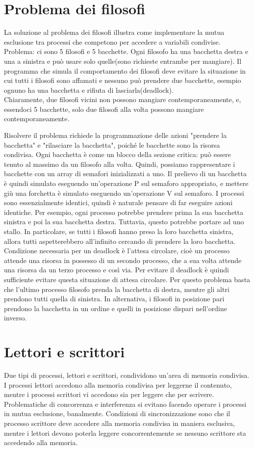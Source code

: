 \documentclass[10pt,a4paper]{book}
\begin{document}
\section{Problema dei filosofi}
La soluzione al problema dei filosofi illustra come implementare la mutua esclusione tra processi che competono per accedere a variabili condivise.
Problema: ci sono 5 filosofi e 5 bacchette. Ogni filosofo ha una bacchetta destra e una a sinistra e può usare solo quelle(sono richieste entrambe per mangiare). Il programma che simula il comportamento dei filosofi deve evitare la situazione in cui tutti i filosofi sono affamati e nessuno può prendere due bacchette, esempio ognuno ha una bacchetta e rifiuta di lasciarla(deadlock).\\
Chiaramente, due filosofi vicini non possono mangiare contemporaneamente, e, essendoci 5 bacchette, solo due filosofi alla volta possono mangiare contemporaneamente.

Risolvere il problema richiede la programmazione delle azioni "prendere la bacchetta" e "rilasciare la bacchetta", poiché le bacchette sono la risorsa condivisa.
Ogni bacchetta è come un blocco della sezione critica: può essere tenuto al massimo da un filosofo alla volta. Quindi, possiamo rappresentare i bacchette con un array di
semafori inizializzati a uno. Il prelievo di un bacchetta è quindi simulato eseguendo un'operazione P sul semaforo appropriato, e mettere giù una forchetta è simulato
eseguendo un'operazione V sul semaforo. I processi sono essenzialmente identici, quindi è naturale pensare di far eseguire azioni identiche. Per esempio, ogni processo potrebbe prendere prima la sua bacchetta sinistra e poi la sua bacchetta destra. Tuttavia, questo potrebbe portare ad uno stallo.
In particolare, se tutti i filosofi hanno preso la loro bacchetta sinistra, allora tutti aspetterebbero all'infinito cercando di prendere la loro bacchetta.
Condizione necessaria per un deadlock è l'attesa circolare, cioè un processo attende una risorsa in possesso di un secondo processo, che a sua volta attende una risorsa da un terzo processo e così via. Per evitare il deadlock è quindi sufficiente evitare questa situazione di attesa circolare. Per questo problema basta che l'ultimo processo filosofo prenda la bacchetta di destra, mentre gli altri prendono tutti quella di sinistra. In alternativa, i filosofi in posizione pari prendono la bacchetta in un ordine e quelli in posizione dispari nell'ordine inverso.

\section{Lettori e scrittori}
Due tipi di processi, lettori e scrittori, condividono un'area di memoria condivisa. I processi lettori accedono alla memoria condivisa per leggerne il contenuto, mentre i processi scrittori vi accedono sia per leggere che per scrivere.
Problematiche di concorrenza e interferenza si evitano facendo operare i processi in mutua esclusione, banalmente. Condizioni di sincronizzazione sono che il processo scrittore deve accedere alla memoria condivisa in maniera esclusiva, mentre i lettori devono poterla leggere concorrentemente se nessuno scrittore sta accedendo alla memoria.
\end{document}
